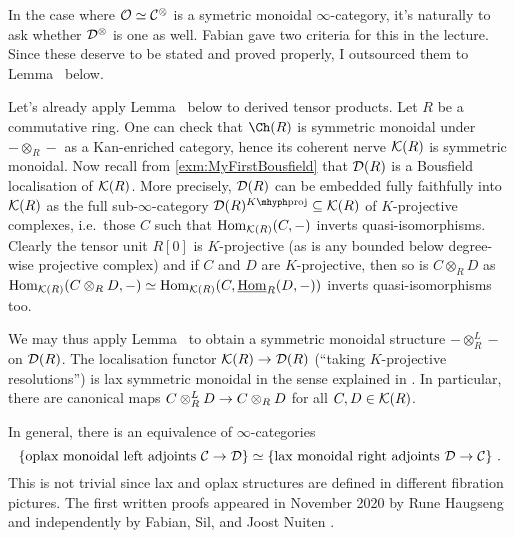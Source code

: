 \begin{exm}
\begin{alphanumerate}
		In the case where $\mathcal{O}\simeq \mathcal{C}^\otimes$ is a symetric monoidal $\infty$-category, it's naturally to ask whether $\mathcal{D}^\otimes$ is one as well. Fabian gave two criteria for this in the lecture. Since these deserve to be stated and proved properly, I outsourced them to Lemma~ below.
		
		
		
			 
		\item Let's already apply Lemma~ below to derived tensor products. Let $R$ be a commutative ring. One can check that $\Ch(R)$ is symmetric monoidal under $-\otimes_R-$ as a Kan-enriched category, hence its coherent nerve $\mathcal{K}(R)$ is symmetric monoidal. Now recall from \cref{exm:MyFirstBousfield} that $\mathcal{D}(R)$ is a Bousfield localisation of $\mathcal{K}(R)$. More precisely, $\mathcal{D}(R)$ can be embedded fully faithfully into $\mathcal{K}(R)$ as the full sub-$\infty$-category $\Dd(R)^{K\mhyph\mathrm{proj}}\subseteq \Kk(R)$ of $K$-projective complexes, i.e.\ those $C$ such that $\operatorname{Hom}_{\mathcal{K}(R)}(C,-)$ inverts quasi-isomorphisms. Clearly the tensor unit $R[0]$ is $K$-projective (as is any bounded below degree-wise projective complex) and if $C$ and $D$ are $K$-projective, then so is $C\otimes_RD$ as $\operatorname{Hom}_{\mathcal{K}(R)}(C\otimes_RD,-)\simeq \operatorname{Hom}_{\mathcal{K}(R)}(C,\operatorname{\underline{Hom}}_R(D,-))$ inverts quasi-isomorphisms too.
		
		We may thus apply Lemma~ to obtain a symmetric monoidal structure $-\otimes_R^L-$ on $\mathcal{D}(R)$. The localisation functor $\Kk(R)\morphism\Dd(R)$ (\enquote{taking $K$-projective resolutions}) is lax symmetric monoidal in the sense explained in . In particular, there are canonical maps $C\otimes_R^LD\morphism C\otimes_RD$ for all $C,D\in \mathcal{K}(R)$.
		\item In general, there is an equivalence of $\infty$-categories
		\begin{equation*}
			\left\{\text{oplax monoidal left adjoints $\mathcal{C}\rightarrow\mathcal{D}$}\right\}\simeq \left\{\text{lax monoidal right adjoints $\mathcal{D}\rightarrow\mathcal{C}$}\right\}\,.
		\end{equation*}
		This is not trivial since lax and oplax structures are defined in different fibration pictures. The first written proofs appeared in November 2020 by Rune Haugseng \cite{HaugsengLaxOplax} and independently by Fabian, Sil, and Joost Nuiten \cite{FabianSilLaxOplax}.
		

\end{alphanumerate}
\end{exm}
